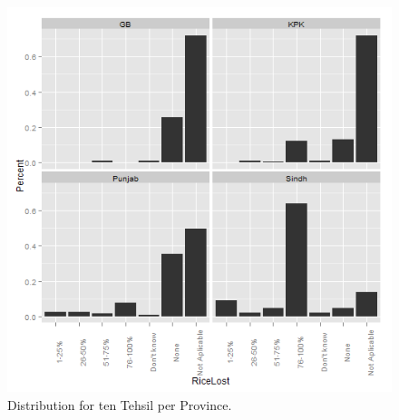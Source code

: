 \begin{figure}[!hbt]
\begin{knitrout}
\color{fgcolor}

{\centering \includegraphics[width=.9\linewidth]{smallerDist/figures/tenDist} 

}


\end{knitrout}

\caption{Distribution for ten Tehsil per Province.\label{fig:tenDist}}
\end{figure}

